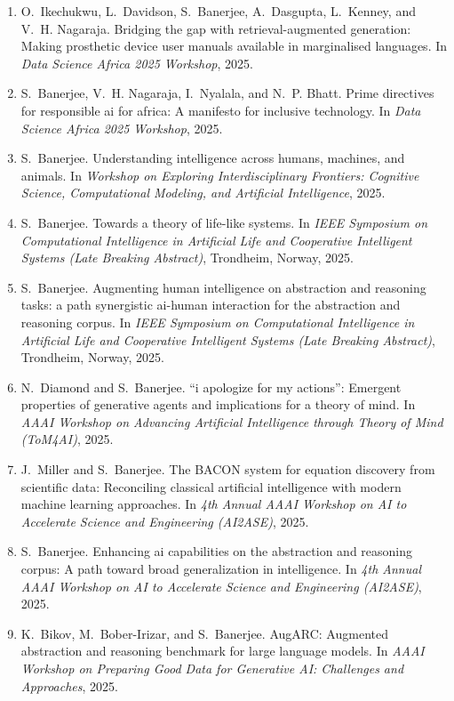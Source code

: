 \documentclass[11pt,a4paper]{article}
\begin{document}
\begin{enumerate}
  \item O.~Ikechukwu, L.~Davidson, S.~Banerjee, A.~Dasgupta, L.~Kenney, and V.~H. Nagaraja. Bridging the gap with retrieval-augmented generation: Making prosthetic device user manuals available in marginalised languages. In {\em Data Science Africa 2025 Workshop}, 2025.
  \item S.~Banerjee, V.~H. Nagaraja, I.~Nyalala, and N.~P. Bhatt. Prime directives for responsible ai for africa: A manifesto for inclusive technology. In {\em Data Science Africa 2025 Workshop}, 2025.
  \item S.~Banerjee. Understanding intelligence across humans, machines, and animals. In {\em Workshop on Exploring Interdisciplinary Frontiers: Cognitive Science, Computational Modeling, and Artificial Intelligence}, 2025.
  \item S.~Banerjee. Towards a theory of life-like systems. In {\em IEEE Symposium on Computational Intelligence in Artificial Life and Cooperative Intelligent Systems (Late Breaking Abstract)}, Trondheim, Norway, 2025.
  \item S.~Banerjee. Augmenting human intelligence on abstraction and reasoning tasks: a path synergistic ai-human interaction for the abstraction and reasoning corpus. In {\em IEEE Symposium on Computational Intelligence in Artificial Life and Cooperative Intelligent Systems (Late Breaking Abstract)}, Trondheim, Norway, 2025.
  \item N.~Diamond and S.~Banerjee. ``i apologize for my actions'': Emergent properties of generative agents and implications for a theory of mind. In {\em AAAI Workshop on Advancing Artificial Intelligence through Theory of Mind (ToM4AI)}, 2025.
  \item J.~Miller and S.~Banerjee. The {BACON} system for equation discovery from scientific data: Reconciling classical artificial intelligence with modern machine learning approaches. In {\em 4th Annual AAAI Workshop on AI to Accelerate Science and Engineering (AI2ASE)}, 2025.
  \item S.~Banerjee. Enhancing ai capabilities on the abstraction and reasoning corpus: A path toward broad generalization in intelligence. In {\em 4th Annual AAAI Workshop on AI to Accelerate Science and Engineering (AI2ASE)}, 2025.
  \item K.~Bikov, M.~Bober-Irizar, and S.~Banerjee. {AugARC}: Augmented abstraction and reasoning benchmark for large language models. In {\em AAAI Workshop on Preparing Good Data for Generative AI: Challenges and Approaches}, 2025.

\end{enumerate}
\end{document}
